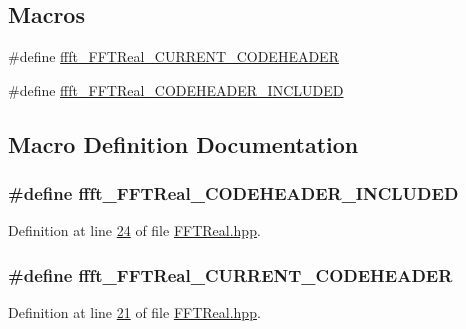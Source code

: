 \subsection*{Macros}
\begin{DoxyCompactItemize}
\item 
\#define \hyperlink{a00096_a7e1c53e720f689723accc78c4835f91c}{ffft\+\_\+\+F\+F\+T\+Real\+\_\+\+C\+U\+R\+R\+E\+N\+T\+\_\+\+C\+O\+D\+E\+H\+E\+A\+D\+E\+R}
\item 
\#define \hyperlink{a00096_adf3b5663ee12a1d9e612686163e7ad52}{ffft\+\_\+\+F\+F\+T\+Real\+\_\+\+C\+O\+D\+E\+H\+E\+A\+D\+E\+R\+\_\+\+I\+N\+C\+L\+U\+D\+E\+D}
\end{DoxyCompactItemize}


\subsection{Macro Definition Documentation}
\hypertarget{a00096_adf3b5663ee12a1d9e612686163e7ad52}{
\subsubsection[{ffft\+\_\+\+F\+F\+T\+Real\+\_\+\+C\+O\+D\+E\+H\+E\+A\+D\+E\+R\+\_\+\+I\+N\+C\+L\+U\+D\+E\+D}]{\setlength{\rightskip}{0pt plus 5cm}\#define ffft\+\_\+\+F\+F\+T\+Real\+\_\+\+C\+O\+D\+E\+H\+E\+A\+D\+E\+R\+\_\+\+I\+N\+C\+L\+U\+D\+E\+D}}\label{a00096_adf3b5663ee12a1d9e612686163e7ad52}


Definition at line \hyperlink{a00096_source_l00024}{24} of file \hyperlink{a00096_source}{F\+F\+T\+Real.\+hpp}.

\hypertarget{a00096_a7e1c53e720f689723accc78c4835f91c}{
\subsubsection[{ffft\+\_\+\+F\+F\+T\+Real\+\_\+\+C\+U\+R\+R\+E\+N\+T\+\_\+\+C\+O\+D\+E\+H\+E\+A\+D\+E\+R}]{\setlength{\rightskip}{0pt plus 5cm}\#define ffft\+\_\+\+F\+F\+T\+Real\+\_\+\+C\+U\+R\+R\+E\+N\+T\+\_\+\+C\+O\+D\+E\+H\+E\+A\+D\+E\+R}}\label{a00096_a7e1c53e720f689723accc78c4835f91c}


Definition at line \hyperlink{a00096_source_l00021}{21} of file \hyperlink{a00096_source}{F\+F\+T\+Real.\+hpp}.

